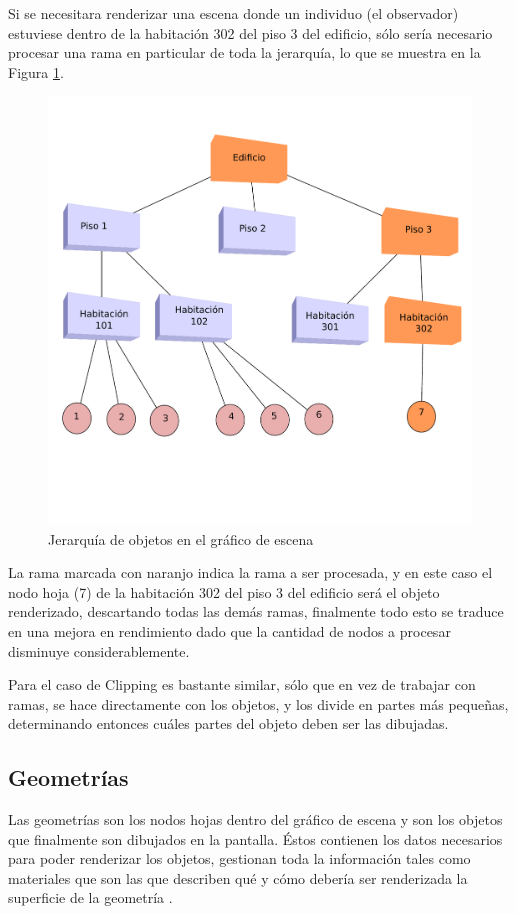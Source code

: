 \documentclass[a4paper,12pt,openany,oneside]{book}
\begin{document}
Si se necesitara renderizar una escena donde un individuo (el observador) estuviese dentro de la habitación 302 del piso 3 del edificio, sólo sería necesario procesar una rama en particular de toda la jerarquía, lo que se muestra en la Figura \ref{culling2label}.
\begin{figure}[!hbp]
\begin{center}
\includegraphics[scale=0.7]{culling2.pdf}
\caption[Ejemplo Culling 2]{Jerarquía de objetos en el gráfico de escena}\label{culling2label}
\end{center}
\end{figure}

La rama marcada con naranjo indica la rama a ser procesada, y en este caso el nodo hoja (7) de la habitación 302 del piso 3 del edificio será el objeto renderizado, descartando todas las demás ramas, finalmente todo esto se traduce en una mejora en rendimiento dado que la cantidad de nodos a procesar disminuye considerablemente. 

Para el caso de Clipping es bastante similar, sólo que en vez de trabajar con ramas, se hace directamente con los objetos, y los divide en partes más pequeñas, determinando entonces cuáles partes del objeto deben ser las dibujadas. 
\subsection{Geometrías}
Las geometrías son los nodos hojas dentro del gráfico de escena y son los objetos que finalmente son dibujados en la pantalla. Éstos contienen los datos necesarios para poder renderizar los objetos, gestionan toda la información tales como materiales que son las que describen qué y cómo debería ser renderizada la superficie de la geometría \cite{BEGINNERS}.
\end{document}
